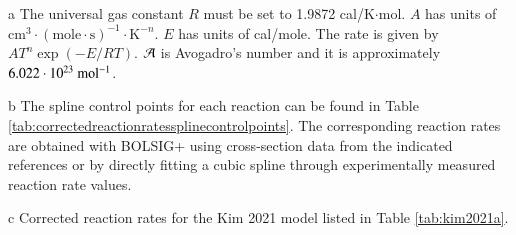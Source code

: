 \documentclass{warpdoc}
\begin{document}
\begin{table}[t]
\begin{center}
\begin{threeparttable}
\begin{tabular}{cccccccc}
                                                                                                                           
\bottomrule
\end{tabular}
\begin{tablenotes}
\item[{a}] The universal gas constant $R$ must be set to 1.9872	cal/K$\cdot$mol. $A$ has units of $\textrm{cm}^3\cdot(\textrm{mole}\cdot \textrm{s})^{-1}\cdot \textrm{K}^{-n}$. $E$ has units of cal/mole. The rate is given by $A T^n \exp(-E/RT)$. ${\cal A}$ is Avogadro's number and it is approximately $6.022 \cdot 10^{23}~{\rm mol^{-1}}$.
\item[{b}] The spline control points for each reaction can be found in Table \ref{tab:correctedreactionratessplinecontrolpoints}. The corresponding reaction rates are obtained with BOLSIG+ using cross-section data from the indicated references or by directly fitting a cubic spline through experimentally measured reaction rate values.
\item[{c}] Corrected reaction rates for the Kim 2021 model listed in Table \ref{tab:kim2021a}.
\end{tablenotes}
\label{tab:rodriguez2024b}
\end{threeparttable}
\end{center}
\end{table}
%
\end{document}
